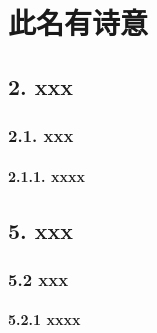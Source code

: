 
\chapter*{此名有诗意}
\section*{2. xxx}
\subsection*{2.1. xxx}
\subsubsection*{2.1.1. xxxx}
\section*{5. xxx}
\subsection*{5.2 xxx}
\subsubsection*{5.2.1 xxxx}
